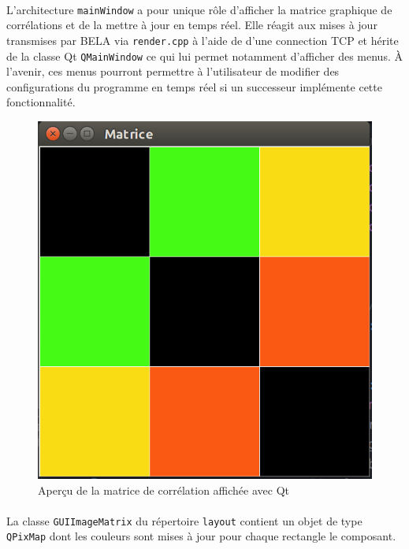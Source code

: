 \paragraph{}
L'architecture \verb!mainWindow! a pour unique rôle d'afficher la
matrice graphique de corrélations et de la mettre à jour en temps
réel. Elle réagit aux mises à jour transmises par BELA via
\verb!render.cpp! à l'aide de d'une connection TCP
et hérite de la classe Qt \verb!QMainWindow! ce qui
lui permet notamment d'afficher des menus. \`{A} l'avenir, ces menus
pourront permettre à l'utilisateur de modifier des configurations du
programme en temps réel si un successeur implémente cette
fonctionnalité.

\begin{figure}[H]
      \centering
      \includegraphics[scale=0.4]{assets/captureRGB.png}
      \caption{Aperçu de la matrice de corrélation affichée avec Qt}
      \label{principe général}
\end{figure}

\paragraph{}
La classe \verb!GUIImageMatrix! du répertoire \verb!layout! contient
un objet de type \verb!QPixMap! dont les couleurs sont mises à jour
pour chaque rectangle le composant.

